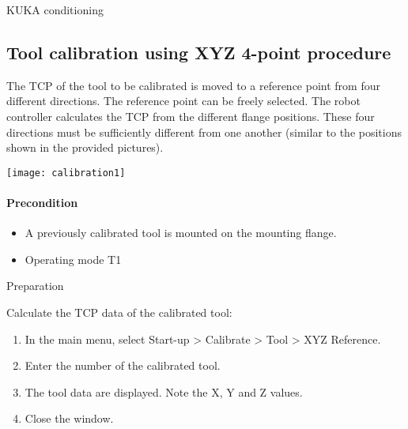 \documentclass{book}
\begin{document}
\begin{chapter}{KUKA conditioning}
		\subsection{Tool calibration using XYZ 4-point procedure}
	
		
	

			The TCP of the tool to be calibrated is moved to a reference point from four different directions. The reference point can be freely selected. The robot controller calculates the TCP from the different flange positions. These four directions must be sufficiently different from one another (similar to the positions shown in the provided pictures).


\newline	\texttt{[image: calibration1]}

		
		\paragraph{Precondition}
		\begin{itemize}
			\item A previously calibrated tool is mounted on the mounting flange.
			\item Operating mode T1
		
		\end{itemize}
		
		Preparation
		
		Calculate the TCP data of the calibrated tool:
		\begin{enumerate}
			\item In the main menu, select Start-up > Calibrate > Tool > XYZ Reference.
			\item Enter the number of the calibrated tool.
			\item The tool data are displayed. Note the X, Y and Z values.
			\item Close the window.
		\end{enumerate}
		

\end{chapter}
\end{document}
